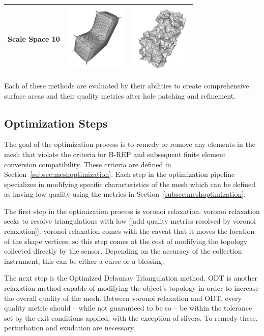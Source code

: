 \documentclass[12pt]{drexelthesis}
\let\Oldsubsection\subsection
\renewcommand{\subsection}{\FloatBarrier\Oldsubsection}
\begin{document}
\begin{table}[!ht]
\begin{tabular}{ | c | c | c | }
	\\
	\hline
	Scale Space 10 	& \includegraphics[width=3cm]{scalespace/clean/scalespace10.png} 
					& \includegraphics[width=3cm]{scalespace/10pnoise/scale10.png}
	\\
	\hline
	\end{tabular}
	\label{table:intialmeshcompare}
	\end{table}
	

Each of these methods are evaluated by their abilities to create comprehensive surface areas and their quality metrics after hole patching and refinement.

\subsection{Optimization Steps}

The goal of the optimization process is to remedy or remove any elements in the mesh that violate the criteria for B-REP and subsequent finite element conversion compatibility. These criteria are defined in Section~\ref{subsec:meshoptimization}. Each step in the optimization pipeline specializes in modifying specific characteristics of the mesh which can be defined as having low quality using the metrics in Section~\ref{subsec:meshoptimization}.

The first step in the optimization process is voronoi relaxation. voronoi relaxation seeks to resolve triangulations with low [[add quality metrics resolved by voronoi relaxation]]. voronoi relaxation comes with the caveat that it moves the location of the shape vertices, so this step comes at the cost of modifying the topology collected directly by the sensor. Depending on the accuracy of the collection instrument, this can be either a curse or a blessing.

The next step is the Optimized Delaunay Triangulation method. ODT is another relaxation method capable of modifying the object's topology in order to increase the overall quality of the mesh. Between voronoi relaxation and ODT, every quality metric should -- while not guaranteed to be so -- be within the tolerance set by the exit conditions applied, with the exception of slivers. To remedy these, perturbation and exudation are necessary.
\end{document}
